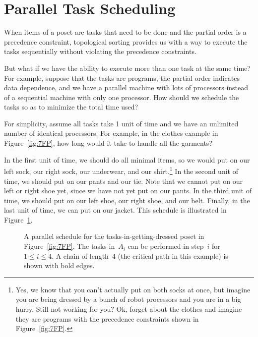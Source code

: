\section{Parallel Task Scheduling}\label{sec:parallel_task}

When items of a poset are tasks that need to be done and the partial
order is a precedence constraint, topological sorting provides us with
a way to execute the tasks sequentially without violating the
precedence constraints.

But what if we have the ability to execute more than one task at the
same time?  For example, suppose that the tasks are programs, the
partial order indicates data dependence, and we have a parallel
machine with lots of processors instead of a sequential machine with
only one processor.  How should we schedule the tasks so as to
minimize the total time used?

For simplicity, assume all tasks take 1 unit of time and we have an
unlimited number of identical processors.  For example, in the clothes
example in Figure~\ref{fig:7FP}, how long would it take to handle all
the garments?

In the first unit of time, we should do all minimal items, so we would
put on our left sock, our right sock, our underwear, and our
shirt.\footnote{Yes, we know that you can't actually put on both socks
  at once, but imagine you are being dressed by a bunch of robot
  processors and you are in a big hurry.  Still not working for you?
  Ok, forget about the clothes and imagine they are programs with the
  precedence constraints shown in Figure~\ref{fig:7FP}.}  In the
second unit of time, we should put on our pants and our tie.  Note
that we cannot put on our left or right shoe yet, since we have not
yet put on our pants.  In the third unit of time, we should put on our
left shoe, our right shoe, and our belt.  Finally, in the last unit of
time, we can put on our jacket.  This schedule is illustrated in
Figure~\ref{fig:7FS}.

\begin{figure}



\caption{A parallel schedule for the tasks-in-getting-dressed poset in
Figure~\ref{fig:7FP}.  The tasks in~$A_i$ can be performed in step~$i$
for $1 \le i \le 4$.  A chain of length~4 (the critical path in this
example) is shown with bold edges.}

\label{fig:7FS}

\end{figure}

